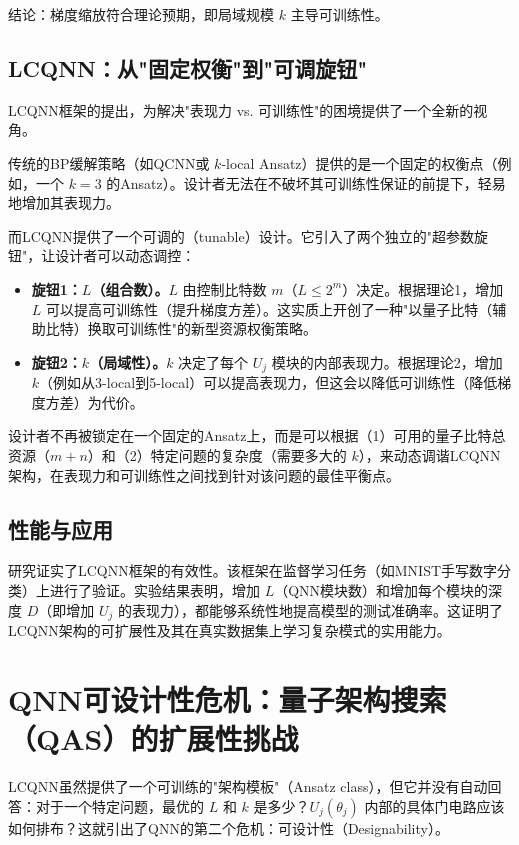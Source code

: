 \documentclass[12pt,a4paper]{article}
\begin{document}
结论：梯度缩放符合理论预期，即局域规模 $k$ 主导可训练性。

\subsection{LCQNN：从"固定权衡"到"可调旋钮"}

LCQNN框架的提出，为解决"表现力 vs. 可训练性"的困境提供了一个全新的视角。

传统的BP缓解策略（如QCNN或 $k$-local Ansatz）提供的是一个固定的权衡点（例如，一个 $k=3$ 的Ansatz）。设计者无法在不破坏其可训练性保证的前提下，轻易地增加其表现力。

而LCQNN提供了一个可调的（tunable）设计。它引入了两个独立的"超参数旋钮"，让设计者可以动态调控：

\begin{itemize}
\item \textbf{旋钮1：$L$（组合数）。}$L$ 由控制比特数 $m$（$L \le 2^m$）决定。根据理论1，增加 $L$ 可以提高可训练性（提升梯度方差）。这实质上开创了一种"以量子比特（辅助比特）换取可训练性"的新型资源权衡策略。

\item \textbf{旋钮2：$k$（局域性）。}$k$ 决定了每个 $U_j$ 模块的内部表现力。根据理论2，增加 $k$（例如从3-local到5-local）可以提高表现力，但这会以降低可训练性（降低梯度方差）为代价。
\end{itemize}

设计者不再被锁定在一个固定的Ansatz上，而是可以根据（1）可用的量子比特总资源（$m+n$）和（2）特定问题的复杂度（需要多大的 $k$），来动态调谐LCQNN架构，在表现力和可训练性之间找到针对该问题的最佳平衡点。

\subsection{性能与应用}

研究证实了LCQNN框架的有效性。该框架在监督学习任务（如MNIST手写数字分类）上进行了验证。实验结果表明，增加 $L$（QNN模块数）和增加每个模块的深度 $D$（即增加 $U_j$ 的表现力），都能够系统性地提高模型的测试准确率。这证明了LCQNN架构的可扩展性及其在真实数据集上学习复杂模式的实用能力。

\section{QNN可设计性危机：量子架构搜索（QAS）的扩展性挑战}

LCQNN虽然提供了一个可训练的"架构模板"（Ansatz class），但它并没有自动回答：对于一个特定问题，最优的 $L$ 和 $k$ 是多少？$U_j(\theta_j)$ 内部的具体门电路应该如何排布？这就引出了QNN的第二个危机：可设计性（Designability）。
\end{document}
